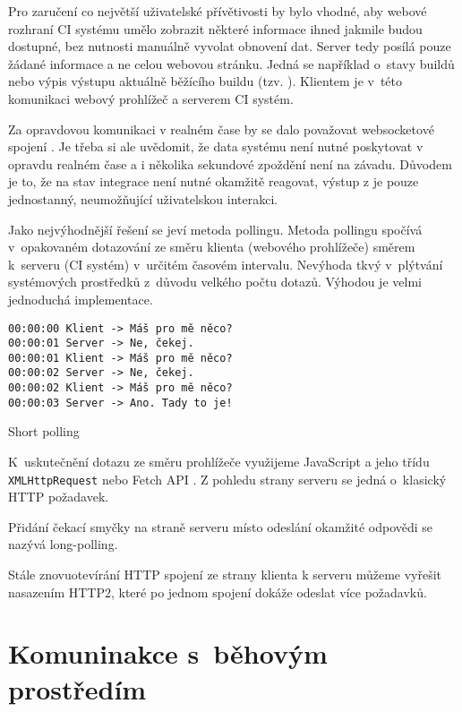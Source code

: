 Pro zaručení co největší uživatelské přívětivosti by bylo vhodné, aby webové rozhraní CI systému umělo zobrazit některé informace ihned jakmile budou dostupné, bez nutnosti manuálně vyvolat obnovení dat.
Server tedy posílá pouze žádané informace a ne celou webovou stránku.
Jedná se například o~stavy buildů nebo výpis výstupu aktuálně běžícího buildu (tzv. ).
Klientem je v~této komunikaci webový prohlížeč a serverem CI systém.

Za opravdovou komunikaci v realném čase by se dalo považovat websocketové spojení \cite{websocket}.
Je třeba si ale uvědomit, že data systému není nutné poskytovat v opravdu realném čase a i několika sekundové zpoždění není na závadu.
Důvodem je to, že na stav integrace není nutné okamžitě reagovat, výstup z  je pouze jednostanný, neumožňující uživatelskou interakci.

Jako nejvýhodnější řešení se jeví metoda pollingu.
Metoda pollingu spočívá v~opakovaném dotazování ze směru klienta (webového prohlížeče) směrem k~serveru (CI systém) v~určitém časovém intervalu.
Nevýhoda tkvý v~plýtvání systémových prostředků z~důvodu velkého počtu dotazů.
Výhodou je velmi jednoduchá implementace.

\begin{listing}[ht]
\begin{verbatim}
00:00:00 Klient -> Máš pro mě něco?
00:00:01 Server -> Ne, čekej.
00:00:01 Klient -> Máš pro mě něco?
00:00:02 Server -> Ne, čekej.
00:00:02 Klient -> Máš pro mě něco?
00:00:03 Server -> Ano. Tady to je!
\end{verbatim}
\caption{Short polling}
\end{listing}

K~uskutečnění dotazu ze směru prohlížeče využijeme JavaScript a jeho třídu \verb|XMLHttpRequest| nebo Fetch API \cite{fetch_api}.
Z pohledu strany serveru se jedná o~klasický HTTP požadavek.

Přidání čekací smyčky na straně serveru místo odeslání okamžité odpovědi se nazývá long-polling.

Stále znovuotevírání HTTP spojení ze strany klienta k serveru můžeme vyřešit nasazením HTTP2, které po jednom spojení dokáže odeslat více požadavků.

\section{Komuninakce s~běhovým prostředím}

